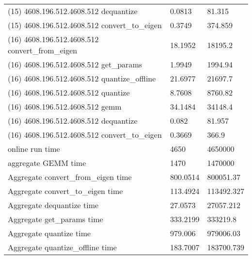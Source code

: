 \begin{longtable}{lll}
(15) 4608.196.512.4608.512 dequantize            & 0.0813         & 81.315           \\
(15) 4608.196.512.4608.512 convert\_to\_eigen    & 0.3749         & 374.859          \\
(16) 4608.196.512.4608.512 convert\_from\_eigen  & 18.1952        & 18195.2          \\
(16) 4608.196.512.4608.512 get\_params           & 1.9949         & 1994.94          \\
(16) 4608.196.512.4608.512 quantize\_offline     & 21.6977        & 21697.7          \\
(16) 4608.196.512.4608.512 quantize              & 8.7608         & 8760.82          \\
(16) 4608.196.512.4608.512 gemm                  & 34.1484        & 34148.4          \\
(16) 4608.196.512.4608.512 dequantize            & 0.082          & 81.957           \\
(16) 4608.196.512.4608.512 convert\_to\_eigen    & 0.3669         & 366.9            \\
online run time                                  & 4650           & 4650000          \\
aggregate GEMM time                              & 1470           & 1470000          \\
Aggregate convert\_from\_eigen time              & 800.0514       & 800051.37        \\
Aggregate convert\_to\_eigen time                & 113.4924       & 113492.327       \\
Aggregate dequantize time                        & 27.0573        & 27057.212        \\
Aggregate get\_params time                       & 333.2199       & 333219.8         \\
Aggregate quantize time                          & 979.006        & 979006.03        \\
Aggregate quantize\_offline time                 & 183.7007       & 183700.739      
\end{longtable}